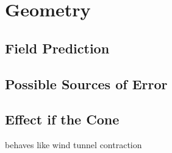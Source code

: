 \label{sec:field}

\section{Geometry}


\subsection{Field Prediction}

\subsection{Possible Sources of Error}

\subsection{Effect if the Cone}

behaves like wind tunnel contraction